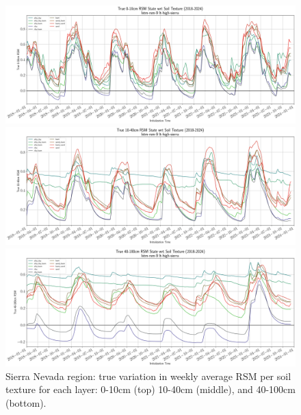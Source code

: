 \begin{figure}[hp!]
    \centering

    \includegraphics[width=.99\linewidth,draft=false]{figures/lt-high-sierra/eval-grid_lt-high-sierra_lstm-rsm-9_pixelwise-time-stats_txtr-true-state-rsm-10.png}

    \includegraphics[width=.99\linewidth,draft=false]{figures/lt-high-sierra/eval-grid_lt-high-sierra_lstm-rsm-9_pixelwise-time-stats_txtr-true-state-rsm-40.png}

    \includegraphics[width=.99\linewidth,draft=false]{figures/lt-high-sierra/eval-grid_lt-high-sierra_lstm-rsm-9_pixelwise-time-stats_txtr-true-state-rsm-100.png}

    \caption{Sierra Nevada region: true variation in weekly average RSM per soil texture for each layer: 0-10cm (top) 10-40cm (middle), and 40-100cm (bottom).}
    \label{lt_true-rsm_miss-alluvial}
\end{figure}


